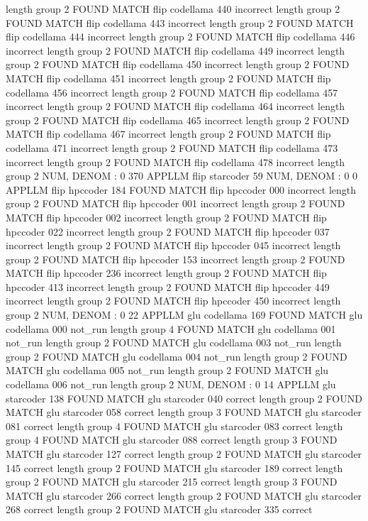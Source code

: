 length group  2
FOUND MATCH flip codellama 440 incorrect
length group  2
FOUND MATCH flip codellama 443 incorrect
length group  2
FOUND MATCH flip codellama 444 incorrect
length group  2
FOUND MATCH flip codellama 446 incorrect
length group  2
FOUND MATCH flip codellama 449 incorrect
length group  2
FOUND MATCH flip codellama 450 incorrect
length group  2
FOUND MATCH flip codellama 451 incorrect
length group  2
FOUND MATCH flip codellama 456 incorrect
length group  2
FOUND MATCH flip codellama 457 incorrect
length group  2
FOUND MATCH flip codellama 464 incorrect
length group  2
FOUND MATCH flip codellama 465 incorrect
length group  2
FOUND MATCH flip codellama 467 incorrect
length group  2
FOUND MATCH flip codellama 471 incorrect
length group  2
FOUND MATCH flip codellama 473 incorrect
length group  2
FOUND MATCH flip codellama 478 incorrect
length group  2
NUM, DENOM : 0 370
APPLLM flip starcoder
59
NUM, DENOM : 0 0
APPLLM flip hpccoder
184
FOUND MATCH flip hpccoder 000 incorrect
length group  2
FOUND MATCH flip hpccoder 001 incorrect
length group  2
FOUND MATCH flip hpccoder 002 incorrect
length group  2
FOUND MATCH flip hpccoder 022 incorrect
length group  2
FOUND MATCH flip hpccoder 037 incorrect
length group  2
FOUND MATCH flip hpccoder 045 incorrect
length group  2
FOUND MATCH flip hpccoder 153 incorrect
length group  2
FOUND MATCH flip hpccoder 236 incorrect
length group  2
FOUND MATCH flip hpccoder 413 incorrect
length group  2
FOUND MATCH flip hpccoder 449 incorrect
length group  2
FOUND MATCH flip hpccoder 450 incorrect
length group  2
NUM, DENOM : 0 22
APPLLM glu codellama
169
FOUND MATCH glu codellama 000 not_run
length group  4
FOUND MATCH glu codellama 001 not_run
length group  2
FOUND MATCH glu codellama 003 not_run
length group  2
FOUND MATCH glu codellama 004 not_run
length group  2
FOUND MATCH glu codellama 005 not_run
length group  2
FOUND MATCH glu codellama 006 not_run
length group  2
NUM, DENOM : 0 14
APPLLM glu starcoder
138
FOUND MATCH glu starcoder 040 correct
length group  2
FOUND MATCH glu starcoder 058 correct
length group  3
FOUND MATCH glu starcoder 081 correct
length group  4
FOUND MATCH glu starcoder 083 correct
length group  4
FOUND MATCH glu starcoder 088 correct
length group  3
FOUND MATCH glu starcoder 127 correct
length group  2
FOUND MATCH glu starcoder 145 correct
length group  2
FOUND MATCH glu starcoder 189 correct
length group  2
FOUND MATCH glu starcoder 215 correct
length group  3
FOUND MATCH glu starcoder 266 correct
length group  2
FOUND MATCH glu starcoder 268 correct
length group  2
FOUND MATCH glu starcoder 335 correct
